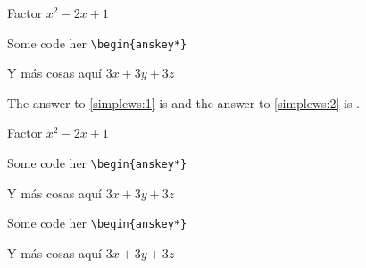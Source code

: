 \documentclass{article}
\begin{document}
\begin{enumext}[save-ans=simplews,columns=2,check-ans=true,show-pos=true,nosep,save-ref=true]
  \item Factor $x^{2}-2x+1$

\begin{anskeyenv}[item-star,write-env=verbatim.txt]
Some code her \verb+\begin{anskey*}+

   \vspace*{1cm}

   Y más cosas aquí $3x+3y+3z$
\end{anskeyenv}


\end{enumext}

The answer to \ref{simplews:1} is and the answer
to \ref{simplews:2} is .


\begin{enumext}[save-ans=simplews,columns=2,check-ans=true,show-pos=true,nosep,save-ref=true]
  \item Factor $x^{2}-2x+1$

\begin{anskeyenv}
Some code her \verb+\begin{anskey*}+

   \vspace*{1cm}

   Y más cosas aquí $3x+3y+3z$
\end{anskeyenv}

\begin{scontents}
Some code her \verb+\begin{anskey*}+

   \vspace*{1cm}

   Y más cosas aquí $3x+3y+3z$
\end{scontents}

\end{enumext}
\end{document}
